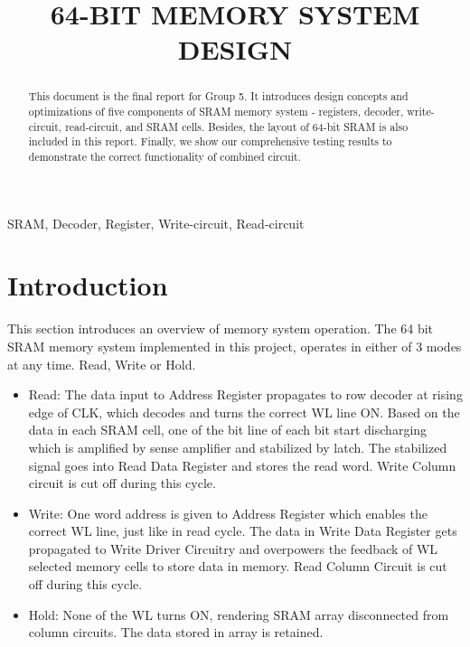 \documentclass[conference]{IEEEtran}
\begin{document}
\title{64-BIT MEMORY SYSTEM DESIGN
}

\author{
}
\maketitle

\begin{abstract}
This document is the final report for Group 5. It introduces design concepts and optimizations of five components of SRAM memory system - registers, decoder, write-circuit, read-circuit, and SRAM cells. Besides, the layout of 64-bit SRAM is also included in this report. Finally, we show our comprehensive testing results to demonstrate the correct functionality of combined circuit.
\end{abstract}

\begin{IEEEkeywords}
SRAM, Decoder, Register, Write-circuit, Read-circuit
\end{IEEEkeywords}

\section{Introduction}
This section introduces an overview of memory system operation. The 64 bit SRAM memory system implemented in this project, operates in either of 3 modes at any time. Read, Write or Hold. 
\begin{itemize}
    \item Read: The data input to Address Register propagates to row decoder at rising edge of CLK, which decodes and turns the correct WL line ON. Based on the data in each SRAM cell, one of the bit line of each bit start discharging which is amplified by sense amplifier and stabilized by latch. The stabilized signal goes into Read Data Register and stores the read word. Write Column circuit is cut off during this cycle. 
    \item Write: One word address is given to Address Register which enables the correct WL line, just like in read cycle. The data in Write Data Register gets propagated to Write Driver Circuitry and overpowers the feedback of WL selected memory cells to store data in memory. Read Column Circuit is cut off during this cycle.  
    \item Hold: None of the WL turns ON, rendering SRAM array disconnected from column circuits. The data stored in array is retained. 
\end{itemize}
\end{document}
